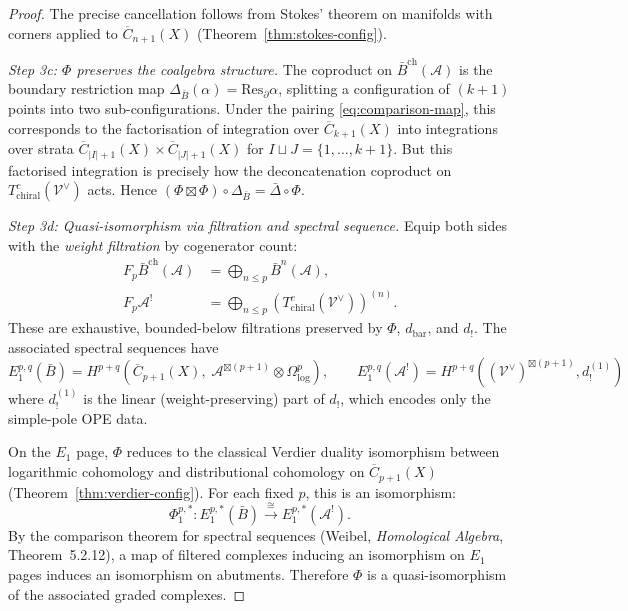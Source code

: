 \begin{proof}
The precise cancellation follows from Stokes' theorem on manifolds with corners applied to $\overline{C}_{n+1}(X)$ (Theorem~\ref{thm:stokes-config}).

\emph{Step 3c: $\Phi$ preserves the coalgebra structure.}  The coproduct on $\bar{B}^{\mathrm{ch}}(\mathcal{A})$ is the boundary restriction map $\Delta_{\bar{B}}(\alpha) = \mathrm{Res}_{\partial}\alpha$, splitting a configuration of $(k+1)$ points into two sub-configurations.  Under the pairing \eqref{eq:comparison-map}, this corresponds to the factorisation of integration over $\overline{C}_{k+1}(X)$ into integrations over strata $\overline{C}_{|I|+1}(X) \times \overline{C}_{|J|+1}(X)$ for $I \sqcup J = \{1,\ldots,k+1\}$.  But this factorised integration is precisely how the deconcatenation coproduct on $T^c_{\mathrm{chiral}}(\mathcal{V}^{\vee})$ acts.  Hence $(\Phi \boxtimes \Phi) \circ \Delta_{\bar{B}} = \bar\Delta \circ \Phi$.

\emph{Step 3d: Quasi-isomorphism via filtration and spectral sequence.}  Equip both sides with the \emph{weight filtration} by cogenerator count:
\begin{align*}
F_p \bar{B}^{\mathrm{ch}}(\mathcal{A}) &= \bigoplus_{n \leq p} \bar{B}^n(\mathcal{A}), \\
F_p \mathcal{A}^! &= \bigoplus_{n \leq p} (T^c_{\mathrm{chiral}}(\mathcal{V}^{\vee}))^{(n)}.
\end{align*}
These are exhaustive, bounded-below filtrations preserved by $\Phi$, $d_{\mathrm{bar}}$, and $d_!$.  The associated spectral sequences have
\[E_1^{p,q}(\bar{B}) = H^{p+q}\!\left(\overline{C}_{p+1}(X),\; \mathcal{A}^{\boxtimes(p+1)} \otimes \Omega^p_{\log}\right), \qquad E_1^{p,q}(\mathcal{A}^!) = H^{p+q}((\mathcal{V}^{\vee})^{\boxtimes(p+1)}, d_!^{(1)})\]
where $d_!^{(1)}$ is the linear (weight-preserving) part of $d_!$, which encodes only the simple-pole OPE data.

On the $E_1$ page, $\Phi$ reduces to the classical Verdier duality isomorphism between logarithmic cohomology and distributional cohomology on $\overline{C}_{p+1}(X)$ (Theorem~\ref{thm:verdier-config}).  For each fixed $p$, this is an isomorphism:
\[\Phi_1^{p,*} \colon E_1^{p,*}(\bar{B}) \xrightarrow{\;\cong\;} E_1^{p,*}(\mathcal{A}^!).\]
By the comparison theorem for spectral sequences (Weibel, \emph{Homological Algebra}, Theorem~5.2.12), a map of filtered complexes inducing an isomorphism on $E_1$ pages induces an isomorphism on abutments.  Therefore $\Phi$ is a quasi-isomorphism of the associated graded complexes.


\end{proof}

